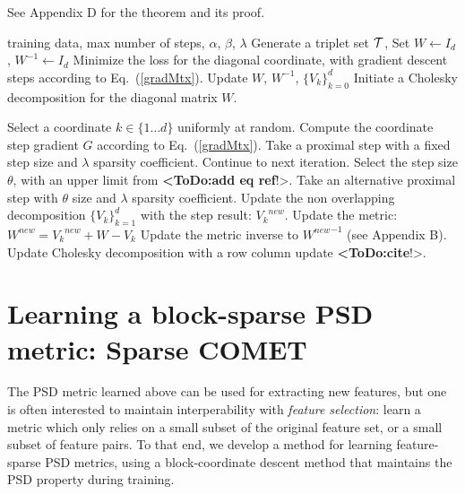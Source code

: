 \documentclass[twoside,11pt]{article}
\newcommand\todo[1]{\textbf{<ToDo:#1}!>}
\newcommand\mat[1]{{#1}}
\newcommand{\W}{\mat{W}}
\newcommand{\newW}{{\mat{W^{new}}}}
\newcommand{\Vk}{\mat{V_k}}
\newcommand{\Vg}{\{\Vk\}_{k=0}^{d}} %
\newcommand{\Vgrc}{\{\Vk\}_{k=1}^{d}} %
\renewcommand{\eqref}[1]{Eq.~(\ref{#1})}
\begin{document}
See Appendix D for the theorem and its proof.



\begin{algorithm}[t]
   \caption{Sparse COMET \todo{FINISH}}
   \label{alg:spcomet}
\begin{algorithmic}[1]
    training data, max number of steps, $\alpha$, $\beta$, $\lambda$
   \STATE Generate a triplet set $\cal{T}$, Set  $\W  \leftarrow I_d$, $\W^{-1}  \leftarrow I_d$
   \STATE Minimize the loss for the diagonal coordinate, with gradient descent steps according to  \eqref{gradMtx}.
   \STATE Update $\W$, $\W^{-1}$, $\Vg$
    \STATE Initiate a Cholesky decomposition for the diagonal matrix $\W$.
    
   \REPEAT 
   \STATE Select a coordinate $k \in \{1 \ldots d\}$ uniformly at random.
   \STATE Compute the coordinate step gradient $\mat{G}$ according to \eqref{gradMtx}.
   \STATE Take a proximal step with a fixed step size and $\lambda$ sparsity coefficient.
     \STATE Continue to next iteration.
   \ELSE 
      \STATE Select the step size $\theta$, with an upper limit from \todo{add eq ref}.
       \STATE Take an alternative proximal step with $\theta$ size and $\lambda$ sparsity coefficient.
      \STATE Update the non overlapping decomposition $\Vgrc$ with the step result: $\Vk^{new}$.
      \STATE Update the metric: $\newW = \Vk^{new} + \W - \Vk$
       \STATE Update the metric inverse to $\newW^{-1}$ (see Appendix B).
       \STATE Update Cholesky decomposition with a row column update \todo{cite}.
    \ENDIF
\end{algorithmic}
\end{algorithm}

\section{Learning a block-sparse PSD metric: Sparse COMET}
The PSD metric learned above can be used for extracting new features, but one is often interested to maintain interperability with \emph{feature selection}: learn a metric which only relies on a small subset of the original feature set, or a small subset of feature pairs. To that end, we develop a method for learning feature-sparse PSD metrics, using a block-coordinate descent method that maintains the PSD property during  training.
\end{document}
